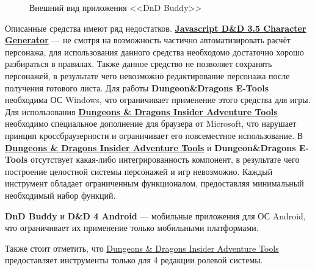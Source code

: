 \begin{figure}[!h]
\caption{Внешний вид приложения <<DnD Buddy>>}
\label{img:dnd_buddy}
\end{figure}


Описанные средства имеют ряд недостатков.
\textbf{\href{http://www.pathguy.com/cg35.htm}{Javascript D\&D 3.5 Character Generator}} --- не смотря на возможность частично автоматизировать расчёт персонажа, для использования данного средства необходомо достаточно хорошо разбираться в правилах. Также данное средство не позволяет сохранять персонажей, в результате чего невозможно редактирование персонажа после получения готового листа.
Для работы \textbf{Dungeon\&Dragons E-Tools} необходима ОС Windows, что ограничивает применение этого средства для игры.
Для использования \textbf{\href{http://www.wizards.com/dnd/Tool.aspx?x=dnd/4new/tool/adventuretools}{Dungeons \& Dragons Insider Adventure Tools}} необходимо специальное дополнение для браузера от Microsoft, что нарушает принцип кроссбраузерности и ограничивает его повсеместное использование.
В \textbf{\href{http://www.wizards.com/dnd/Tool.aspx?x=dnd/4new/tool/adventuretools}{Dungeons \& Dragons Insider Adventure Tools}} и \textbf{Dungeon\&Dragons E-Tools} отсутствует какая-либо интегрированность компонент, в результате чего построение целостной системы персонажей и игр невозможно. Каждый инструмент обладает ограниченным функционалом, предоставляя минимальный необходимый набор функций.

\textbf{DnD Buddy} и \textbf{D\&D 4 Android} --- мобильные приложения для ОС Android, что ограничивает их применение только мобильными платформами.

Также стоит отметить, что \href{http://www.wizards.com/dnd/Tool.aspx?x=dnd/4new/tool/adventuretools}{Dungeons \& Dragons Insider Adventure Tools} предоставляет инструменты только для 4 редакции ролевой системы.
